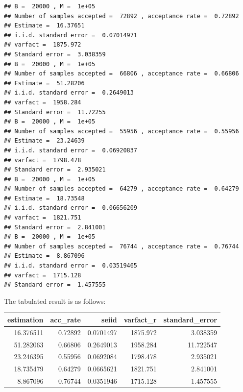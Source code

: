 \begin{knitrout}
\color{fgcolor}\begin{kframe}
\begin{verbatim}
## B =  20000 , M =  1e+05 
## Number of samples accepted =  72892 , acceptance rate =  0.72892 
## Estimate =  16.37651 
## i.i.d. standard error =  0.07014971 
## varfact =  1875.972 
## Standard error =  3.038359
## B =  20000 , M =  1e+05 
## Number of samples accepted =  66806 , acceptance rate =  0.66806 
## Estimate =  51.28206 
## i.i.d. standard error =  0.2649013 
## varfact =  1958.284 
## Standard error =  11.72255
## B =  20000 , M =  1e+05 
## Number of samples accepted =  55956 , acceptance rate =  0.55956 
## Estimate =  23.24639 
## i.i.d. standard error =  0.06920837 
## varfact =  1798.478 
## Standard error =  2.935021
## B =  20000 , M =  1e+05 
## Number of samples accepted =  64279 , acceptance rate =  0.64279 
## Estimate =  18.73548 
## i.i.d. standard error =  0.06656209 
## varfact =  1821.751 
## Standard error =  2.841001
## B =  20000 , M =  1e+05 
## Number of samples accepted =  76744 , acceptance rate =  0.76744 
## Estimate =  8.867096 
## i.i.d. standard error =  0.03519465 
## varfact =  1715.128 
## Standard error =  1.457555
\end{verbatim}
\end{kframe}
\end{knitrout}
The tabulated result is as follows:\\
\begin{center}
\begin{knitrout}
\color{fgcolor}
\begin{tabular}{r|r|r|r|r}
\hline
estimation & acc\_rate & seiid & varfact\_r & standard\_error\\
\hline
16.376511 & 0.72892 & 0.0701497 & 1875.972 & 3.038359\\
\hline
51.282063 & 0.66806 & 0.2649013 & 1958.284 & 11.722547\\
\hline
23.246395 & 0.55956 & 0.0692084 & 1798.478 & 2.935021\\
\hline
18.735479 & 0.64279 & 0.0665621 & 1821.751 & 2.841001\\
\hline
8.867096 & 0.76744 & 0.0351946 & 1715.128 & 1.457555\\
\hline
\end{tabular}


\end{knitrout}
\end{center}

